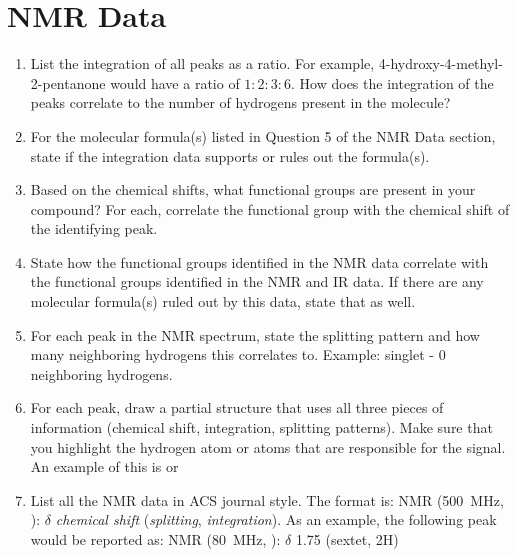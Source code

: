 \documentclass[titlepage]{article}
\begin{document}
\section*{ NMR Data}
\begin{enumerate}
    \item List the integration of all peaks as a ratio. For example, 4-hydroxy-4-methyl-2-pentanone would have a ratio of $1:2:3:6$. How does the integration of the peaks correlate to the number of hydrogens present in the molecule?
    \item For the molecular formula(s) listed in Question 5 of the  NMR Data section, state if the integration data supports or rules out the formula(s).
    \item Based on the chemical shifts, what functional groups are present in your compound? For each, correlate the functional group with the chemical shift of the identifying peak.
    \item State how the functional groups identified in the  NMR data correlate with the functional groups identified in the  NMR and IR data. If there are any molecular formula(s) ruled out by this data, state that as well.
    \item For each peak in the  NMR spectrum, state the splitting pattern and how many neighboring hydrogens this correlates to. Example: singlet - 0 neighboring hydrogens.
    \item For each peak, draw a partial structure that uses all three pieces of information (chemical shift, integration, splitting patterns). Make sure that you highlight the hydrogen atom or atoms that are responsible for the signal. An example of this is  or
    \begin{center}
        \footnotesize
    \end{center}
    \item List all the  NMR data in ACS journal style. The format is:  NMR (\SI{500}{\mega\hertz}, ): $\delta$ \emph{chemical shift} (\emph{splitting}, \emph{integration}). As an example, the following peak would be reported as:  NMR (\SI{80}{\mega\hertz}, ): $\delta$ 1.75 (sextet, 2H)
    \begin{center}
\end{center}
\end{enumerate}
\end{document}
